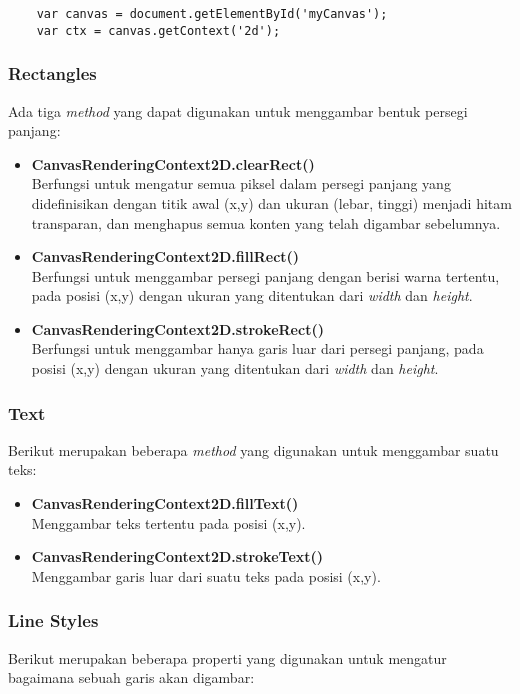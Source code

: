 \begin{lstlisting}
	var canvas = document.getElementById('myCanvas');
	var ctx = canvas.getContext('2d');
\end{lstlisting}

\subsubsection{Rectangles}
Ada tiga \textit{method} yang dapat digunakan untuk menggambar bentuk persegi panjang:

\begin{itemize}
	\item \textbf{CanvasRenderingContext2D.clearRect()} \\ Berfungsi untuk mengatur semua piksel dalam persegi panjang yang didefinisikan dengan titik awal (x,y) dan ukuran (lebar, tinggi) menjadi hitam transparan, dan menghapus semua konten yang telah digambar sebelumnya.
	\item \textbf{CanvasRenderingContext2D.fillRect()} \\ Berfungsi untuk menggambar persegi panjang dengan berisi warna tertentu, pada posisi (x,y) dengan ukuran yang ditentukan dari \textit{width} dan \textit{height}.
	\item \textbf{CanvasRenderingContext2D.strokeRect()} \\ Berfungsi untuk menggambar hanya garis luar dari persegi panjang, pada posisi (x,y) dengan ukuran yang ditentukan dari \textit{width} dan \textit{height}.
\end{itemize}

\subsubsection{Text}
Berikut merupakan beberapa \textit{method} yang digunakan untuk menggambar suatu teks:

\begin{itemize}
	\item \textbf{CanvasRenderingContext2D.fillText()} \\ Menggambar teks tertentu pada posisi (x,y).
	\item \textbf{CanvasRenderingContext2D.strokeText()} \\ Menggambar garis luar dari suatu teks pada posisi (x,y).
\end{itemize}

\subsubsection{Line Styles}
Berikut merupakan beberapa properti yang digunakan untuk mengatur bagaimana sebuah garis akan digambar:

